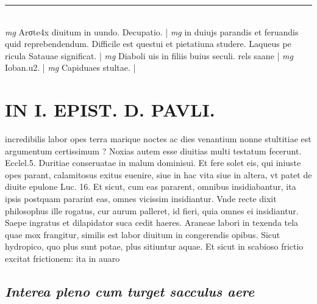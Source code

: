\documentclass{article}
\begin{document}
\begin{pages}
\vspace{0.5cm}\noindent
\vspace{0.2cm}\rule{1cm}{0.2pt}\\ 
\hspace{0.2cm}\textit{mg}
\footnotesize Arσte4x diuitum in uundo. Decupatio. 
\normalsize| 
\hspace{0.2cm}\textit{mg}
\footnotesize in duiujs parandis et feruandis quid reprebendendum. Difficile est questui et pietatiuna studere. Laqueus pe ricula Satauae significat. 
\normalsize| 
\hspace{0.2cm}\textit{mg}
\footnotesize Diaboli uis in filiis buius seculi. rels saane
\normalsize| 
\hspace{0.2cm}\textit{mg}
\footnotesize Ioban.u2. 
\normalsize| 
\hspace{0.2cm}\textit{mg}
\footnotesize Capiduaes stultae. 
\normalsize| 
\section*{IN I. EPIST. D. PAVLI. }
\marginpar{[ p.126 ]}\pstart incredibilis labor opes terra marique noctes ac dies venantium nonne stultitiae est argumentum certissimum ? Noxias autem esse diuitias multi testatum fecerunt. Ecclel.5. Duritiae conseruatae in malum dominisui. Et fere solet eis, qui iniuste opes parant, calamitosus exitus euenire, siue in hac vita siue in altera, vt patet de diuite epulone Luc. 16. Et sicut, cum eas pararent, omnibus insidiabantur, ita ipsis postquam pararint eas, omnes vicissim insidiantur. Vnde recte dixit philosophus ille rogatus, cur aurum palleret, id fieri, quia omnes ei insidiantur. Saepe ingratus et dilapidator suca cedit haeres. Araneae labori in texenda tela quae mox frangitur, similis est labor diuitum in congerendis opibus. Sicut hydropico, quo plus sunt potae, plus sitiuntur aquae. Et sicut in scabioso frictio excitat frictionem: ita in auaro  \pend
{}
{}
\subsection*{\textit{Interea pleno cum turget sacculus aere }}
{}

\end{pages}
\end{document}
